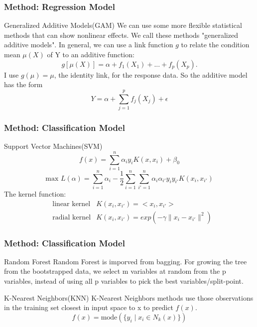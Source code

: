 \documentclass{beamer}
\begin{document}

\begin{frame}
\frametitle{Method: Regression Model}
\begin{block}{Generalized Additive Models(GAM)}
We can use some more flexible statistical methods that can show nonlinear effects. We call these methods "generalized additive models". In general, we can use a link function $g$ to relate the condition mean $\mu(X)$ of Y to an additive function: $$g[\mu(X)] = \alpha + f_1(X_1) + ... + f_p(X_p).$$
I use $g(\mu) = \mu$, the identity link, for the response data. So the additive model has the form $$Y=\alpha+\sum_{j=1}^{p} f_j(X_j)+\epsilon$$
\end{block}

\end{frame}


\begin{frame}
\frametitle{Method: Classification Model}
\begin{block}{Support Vector Machines(SVM)}
$$f(x) = \sum_{i=1}^{n}\alpha_i y_i K(x, x_i) + \beta_0$$
$$\text{max }L(\alpha)=\sum_{i=1}^{n} \alpha_i - \frac{1}{2}\sum_{i=1}^{n}\sum_{i'=1}^{n}\alpha_i \alpha_{i'} y_i y_{i'} K(x_i,x_{i'})$$
The kernel function:
    \begin{align}
        &\text{linear kernel}  &K(x_i,x_{i'})=<x_i,x_{i'}> \nonumber \\
        &\text{radial kernel}  &K(x_i,x_{i'})=exp(-\gamma \lVert x_i-x_{i'} \rVert^2) \nonumber
    \end{align}
\end{block}


\end{frame}


\begin{frame}
\frametitle{Method: Classification Model}
\begin{block}{Random Forest}
Random Forest is imporved from bagging. For growing the tree from the bootstrapped data, we select m variables at random from the p variables, instead of using all p variables to pick the best variables/split-point.
\end{block}
\begin{block}{K-Nearest Neighbors(KNN)}
K-Nearest Neighbors methods use those observations in the training set closest
in input space to x to predict $f(x)$.
$$f(x) = \text{mode}(\{ y_i \mid x_i \in N_k(x)\})$$
\end{block}


\end{frame}
\end{document}
